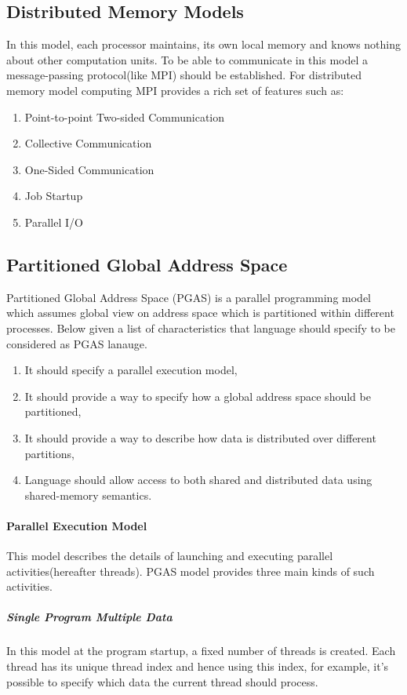 \documentclass[14pt]{extreport}
\begin{document}
\subsection{Distributed Memory Models}
In this model, each processor maintains, its own local memory and knows nothing about other computation units.
To be able to communicate in this model a message-passing protocol(like MPI) should be established. For distributed memory model computing MPI provides a rich set of features such as:
\begin{enumerate}
\item Point-to-point Two-sided Communication
\item Collective Communication 
\item One-Sided Communication
\item Job Startup
\item Parallel I/O
\end{enumerate}

\subsection{Partitioned Global Address Space}
Partitioned Global Address Space (PGAS) is a parallel programming model which assumes global view on address space which is partitioned within different processes. Below given a list of characteristics that language should specify to be considered as PGAS lanauge\cite{pgaslangs}.
\begin{enumerate}
	\item It should specify a parallel execution model,
	\item It should provide a way to specify how a global address space should be partitioned,
	\item It should provide a way to describe how data is distributed over different partitions,
	\item Language should allow access to both shared and distributed data using shared-memory semantics.
\end{enumerate}

\paragraph{Parallel Execution Model}
This model describes the details of launching and executing parallel activities(hereafter threads). PGAS model provides three main kinds of such activities.

\subparagraph{Single Program Multiple Data}
In this model at the program startup, a fixed number of threads is created. Each thread has its unique thread index and hence using this index, for example, it's possible to specify which data the current thread should process.
\end{document}
